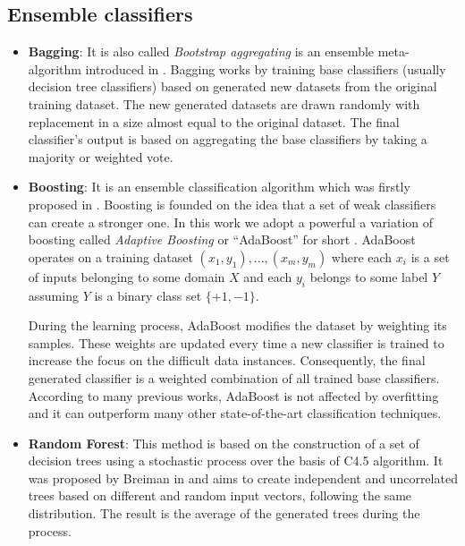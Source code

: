 \documentclass[a4paper,10pt,onecolumn,preprint,3p]{elsarticle}
\begin{document}
\subsection{Ensemble classifiers}
\label{subsec:ensembles}


\begin{itemize}
\item \textbf{Bagging}: 
It is also called \textit{Bootstrap aggregating} is an ensemble meta-algorithm introduced in \cite{B1996}. Bagging works by training base classifiers (usually decision tree classifiers) based on generated new datasets from the original training dataset. The new generated datasets are drawn randomly with replacement in a size almost equal to the original dataset. 
The final classifier's output is based on aggregating the base classifiers by taking a majority or weighted vote.


\item \textbf{Boosting}: 
It is an ensemble classification algorithm which was firstly proposed in \cite{schapire1990strength}. Boosting is founded on the idea that a set of weak classifiers can create a stronger one. In this work we adopt a powerful a variation of boosting called \textit{Adaptive Boosting} or ``AdaBoost'' for short \cite{FS1997}. AdaBoost operates on a training dataset ${(x_{1},y_{1}),...,(x_{m},y_{m})}$ where each $x_{i}$ is a set of inputs belonging to some domain $X$ and each $y_{i}$ belongs to some label $Y$ assuming $Y$ is a binary class set $\{+1,-1\}$. 


During the learning process, AdaBoost modifies the dataset by weighting its samples. These weights are updated every time a new classifier is trained to increase the focus 
on the difficult data instances. Consequently, the final generated classifier is a weighted combination of all trained base classifiers. According to many previous works, 
AdaBoost is not affected 
by overfitting and it can outperform many other state-of-the-art classification techniques.


\item \textbf{Random Forest}:
This method is based on the construction of a set of decision trees using a stochastic process over the basis of C4.5 algorithm. It was proposed by Breiman in \cite{Breiman2001} and aims to create independent and uncorrelated trees based on different and random input vectors, following the same distribution. 
The result is the average of the generated trees during the process.


\end{itemize}
\end{document}
